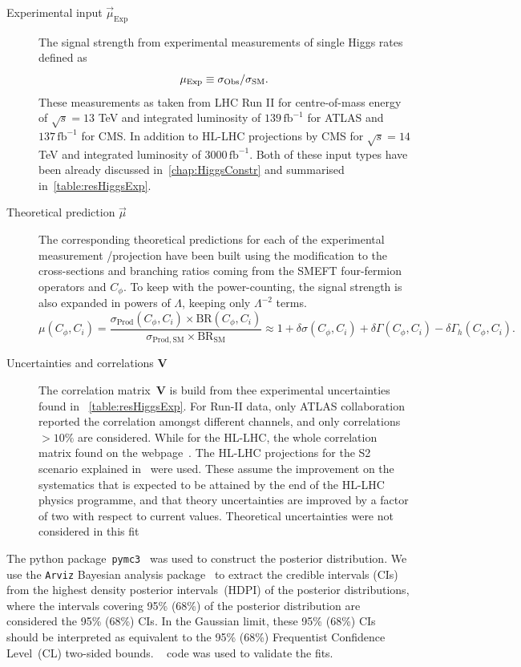 \begin{description}
	\item[Experimental input $\vec{\mu}_{\mathrm{Exp}}$ ] The signal strength from experimental measurements of single Higgs rates defined as
	\begin{equation}
		\mu_{\mathrm{Exp}}\equiv \sigma_{\mathrm{Obs}}/\sigma_{\mathrm{SM}}.
	\end{equation}
These measurements as taken from LHC Run II for centre-of-mass energy of $\sqrt{s} = 13$ TeV and  integrated luminosity of $ 139\, \mathrm{fb}^{-1}$ for ATLAS and  $ 137\,\mathrm{fb}^{-1}$ for CMS. In addition to HL-LHC projections by CMS for $\sqrt{s} = 14$ TeV and  integrated luminosity of $ 3000\, \mathrm{fb}^{-1}$. Both of these input types have been already discussed in~\autoref{chap:HiggsConstr} and summarised in~\autoref{table:resHiggsExp}.
\item [Theoretical prediction $\vec{\mu}$ ]  The corresponding theoretical predictions for each of the experimental measurement /projection have been built using the modification to the cross-sections and branching ratios coming from the SMEFT four-fermion operators and $C_\phi$. To keep with the power-counting, the signal strength is also expanded in powers of $\Lambda$, keeping only $ \Lambda^{-2}$ terms. 
\begin{equation}
	\mu(C_\phi,C_i)=\frac{\sigma_\mathrm{ Prod}(C_\phi,C_i) \times \mathrm{ BR}(C_\phi,C_i)}{\sigma_\mathrm{ Prod, SM}\times \mathrm{BR}_\mathrm{ SM}} \approx 1+\delta \sigma(C_\phi,C_i)+\delta\Gamma(C_\phi,C_i)-\delta \Gamma_h(C_\phi,C_i).
	\label{linear-mu}
\end{equation}
\item [Uncertainties and correlations $\mathbf{V}$ ]  The correlation matrix~$\mathbf{V}$ is build from thee experimental uncertainties found in ~\autoref{table:resHiggsExp}. For Run-II data, only ATLAS collaboration reported the correlation amongst different channels, and only correlations $> 10\%$ are considered. While for the HL-LHC, the whole correlation matrix found on the webpage~\cite{twiki}.  The HL-LHC projections for the S2 scenario explained in~\cite{Cepeda:2019klc} were used. These assume the improvement on the systematics that is expected to be attained by the end of the HL-LHC physics programme, and that theory uncertainties are improved by a factor of two with respect to current values. Theoretical uncertainties were not considered in this fit
\end{description}
The python package~\texttt{pymc3}~\cite{Salvatier2016} was used to construct the posterior distribution. We use the \texttt{Arviz} Bayesian analysis package~\cite{arviz_2019} to extract the credible intervals (CIs) from the highest density posterior intervals~(HDPI) of the posterior distributions, where the intervals covering 95\% (68\%) of the posterior distribution are considered the 95\% (68\%) CIs. In the Gaussian limit, these  95\% (68\%) CIs should be interpreted as equivalent to the 95\%  (68\%) Frequentist  Confidence Level~(CL) two-sided bounds. \HEPfit~\cite{deBlas:2019okz} code was used to validate the fits.
